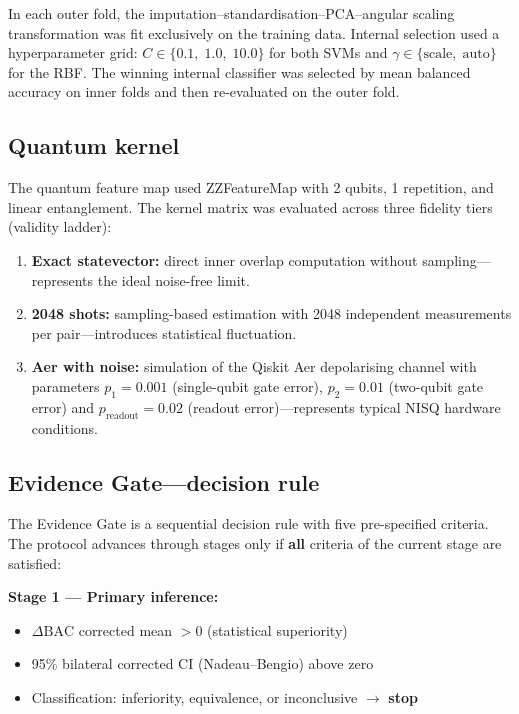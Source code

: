 \documentclass[11pt,a4paper]{article}
\newcommand{\BAC}{\mathrm{BAC}}
\begin{document}
In each outer fold, the imputation--standardisation--PCA--angular scaling
transformation was fit exclusively on the training data. Internal selection
used a hyperparameter grid: $C \in \{0.1,\; 1.0,\; 10.0\}$ for both SVMs and
$\gamma \in \{\text{scale},\; \text{auto}\}$ for the RBF. The winning internal
classifier was selected by mean balanced accuracy on inner folds and then
re-evaluated on the outer fold.

\subsection{Quantum kernel}
\label{ssec:qkernel}

The quantum feature map used ZZFeatureMap with 2 qubits, 1 repetition, and
linear entanglement. The kernel matrix was evaluated across three fidelity tiers
(validity ladder):
\begin{enumerate}[label=\arabic*.]
  \item \textbf{Exact statevector:} direct inner overlap computation without
        sampling---represents the ideal noise-free limit.
  \item \textbf{2048 shots:} sampling-based estimation with 2048 independent
        measurements per pair---introduces statistical fluctuation.
  \item \textbf{Aer with noise:} simulation of the Qiskit Aer depolarising
        channel with parameters $p_1 = 0.001$ (single-qubit gate error),
        $p_2 = 0.01$ (two-qubit gate error) and $p_{\text{readout}} = 0.02$
        (readout error)---represents typical NISQ hardware conditions.
\end{enumerate}

\subsection{Evidence Gate---decision rule}
\label{ssec:gate}

The Evidence Gate is a sequential decision rule with five pre-specified
criteria. The protocol advances through stages only if \textbf{all} criteria
of the current stage are satisfied:

\medskip
\noindent\textbf{Stage 1 --- Primary inference:}
\begin{itemize}
  \item $\Delta\BAC$ corrected mean $> 0$ (statistical superiority)
  \item 95\% bilateral corrected CI (Nadeau--Bengio) above zero
  \item Classification: inferiority, equivalence, or inconclusive
        $\to$ \textbf{stop}
\end{itemize}
\end{document}
